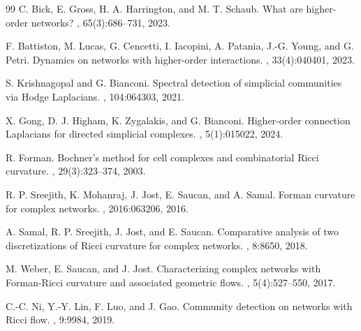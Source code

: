 \documentclass[11pt]{article}
\begin{document}
\begin{thebibliography}{99}
C. Bick, E. Gross, H. A. Harrington, and M. T. Schaub.
\newblock What are higher-order networks?
, 65(3):686--731, 2023.

F. Battiston, M. Lucas, G. Cencetti, I. Iacopini, A. Patania, J.-G. Young, and G. Petri.
\newblock Dynamics on networks with higher-order interactions.
, 33(4):040401, 2023.

S. Krishnagopal and G. Bianconi.
\newblock Spectral detection of simplicial communities via Hodge Laplacians.
, 104:064303, 2021.

X. Gong, D. J. Higham, K. Zygalakis, and G. Bianconi.
\newblock Higher-order connection Laplacians for directed simplicial complexes.
, 5(1):015022, 2024.

R. Forman.
\newblock Bochner's method for cell complexes and combinatorial Ricci curvature.
, 29(3):323--374, 2003.

R. P. Sreejith, K. Mohanraj, J. Jost, E. Saucan, and A. Samal.
\newblock Forman curvature for complex networks.
, 2016:063206, 2016.

A. Samal, R. P. Sreejith, J. Jost, and E. Saucan.
\newblock Comparative analysis of two discretizations of Ricci curvature for complex networks.
, 8:8650, 2018.

M. Weber, E. Saucan, and J. Jost.
\newblock Characterizing complex networks with Forman-Ricci curvature and associated geometric flows.
, 5(4):527--550, 2017.

C.-C. Ni, Y.-Y. Lin, F. Luo, and J. Gao.
\newblock Community detection on networks with Ricci flow.
, 9:9984, 2019.

\end{thebibliography}
\end{document}
